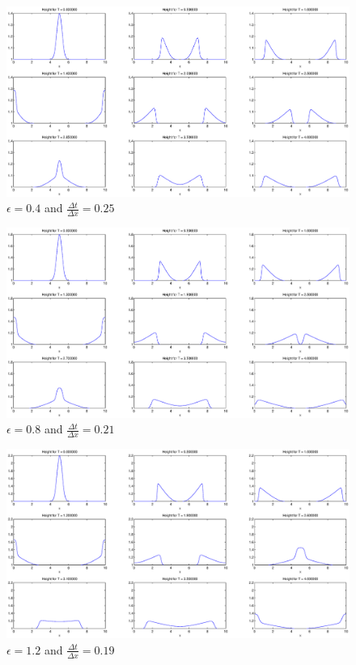 \begin{figure}
\begin{center}
\includegraphics[scale=0.4]{eps04.eps}
\caption{$\epsilon = 0.4$ and $\frac{\Delta t}{\Delta x}=0.25$}
\label{eps04}
\end{center}
\end{figure}

\begin{figure}
\begin{center}
\includegraphics[scale=0.4]{eps08.eps}
\caption{$\epsilon = 0.8$ and $\frac{\Delta t}{\Delta x}=0.21$}
\label{eps08}
\end{center}
\end{figure}

\begin{figure}
\begin{center}
\includegraphics[scale=0.4]{eps12.eps}
\caption{$\epsilon = 1.2$ and $\frac{\Delta t}{\Delta x}=0.19$}
\label{eps12}
\end{center}
\end{figure}

